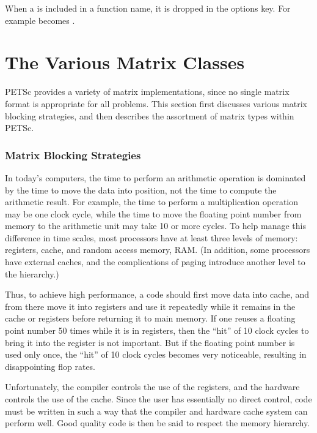 \documentclass[twoside,12pt]{../sty/report_petsc}
\newcommand{\sindex}[1]{\index{#1}}
\begin{document}
When a  is included in a function name, it is dropped in the options key.
For example  becomes .

\chapter{The Various Matrix Classes}
\label{sec:matclasses}

PETSc provides a variety of matrix implementations, since no single
matrix format is appropriate for all problems.  This section first
discusses various matrix blocking strategies, and then 
describes the assortment of matrix types within PETSc.

\subsection{Matrix Blocking Strategies}
\sindex{matrix blocking} 
\sindex{blocking} 

In today's computers, the time to perform an arithmetic operation is
dominated by the time to move the data into position, not the time to
compute the arithmetic result.  For example, the time to perform a
multiplication operation may be one clock cycle, while the time to
move the floating point number from memory to the arithmetic unit may
take 10 or more cycles. To help manage this difference in time scales,
most processors have at least three levels of memory: registers,
cache, and random access memory, RAM. (In addition, some processors
have external caches, and the complications of paging introduce
another level to the hierarchy.)

Thus, to achieve high performance, a code should first move data into
cache, and from there move it into registers and use it repeatedly
while it remains in the cache or registers before returning it to main
memory. If one reuses a floating point number 50 times while it is in
registers, then the ``hit'' of 10 clock cycles to bring it into the
register is not important. But if the floating point number is used
only once, the ``hit'' of 10 clock cycles becomes very noticeable,
resulting in disappointing flop rates.

Unfortunately, the compiler controls the use of the registers, and the
hardware controls the use of the cache. Since the user has essentially
no direct control, code must be written in such a way that the
compiler and hardware cache system can perform well. Good quality code
is then be said to respect the memory hierarchy.
\end{document}
